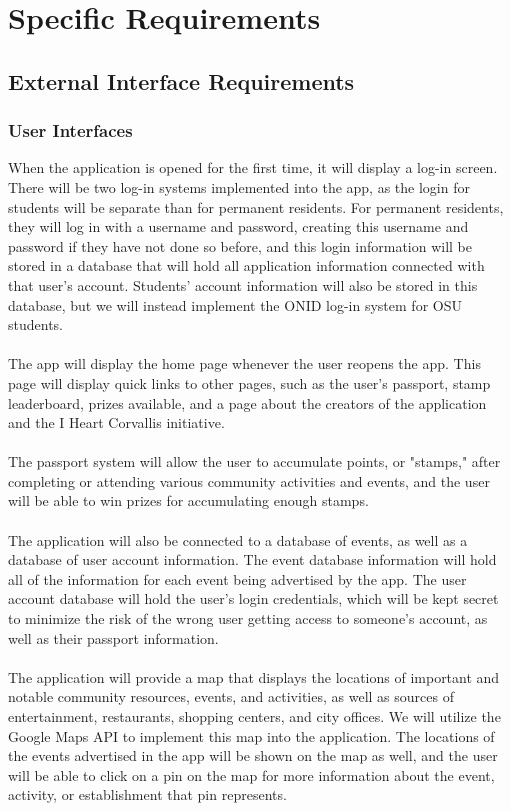 \documentclass[draftclsnofoot, onecolumn, 10pt, compsoc]{IEEEtran}
\begin{document}
	\section{Specific Requirements}
		\subsection{External Interface Requirements}
			\subsubsection{User Interfaces}
				When the application is opened for the first time, it will display a log-in screen. There will be two log-in systems implemented into the app, as the login for students will be separate than for permanent residents. For permanent residents, they will log in with a username and password, creating this username and password if they have not done so before, and this login information will be stored in a database that will hold all application information connected with that user's account. Students' account information will also be stored in this database, but we will instead implement the ONID log-in system for OSU students. \\ \\
				The app will display the home page whenever the user reopens the app. This page will display quick links to other pages, such as the user's passport, stamp leaderboard, prizes available, and a page about the creators of the application and the I Heart Corvallis initiative. \\ \\
				The passport system will allow the user to accumulate points, or "stamps," after completing or attending various community activities and events, and the user will be able to win prizes for accumulating enough stamps. \\ \\
				The application will also be connected to a database of events, as well as a database of user account information. The event database information will hold all of the information for each event being advertised by the app. The user account database will hold the user's login credentials, which will be kept secret to minimize the risk of the wrong user getting access to someone's account, as well as their passport information. \\ \\
				The application will provide a map that displays the locations of important and notable community resources, events, and activities, as well as sources of entertainment, restaurants, shopping centers, and city offices. We will utilize the Google Maps API to implement this map into the application. The locations of the events advertised in the app will be shown on the map as well, and the user will be able to click on a pin on the map for more information about the event, activity, or establishment that pin represents.
				
\end{document}
